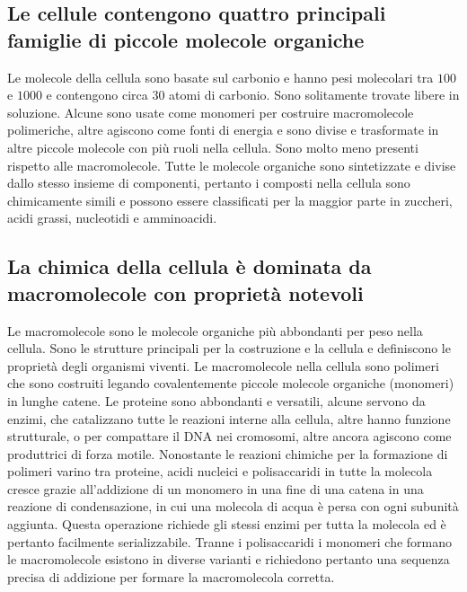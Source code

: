 \subsection{Le cellule contengono quattro principali famiglie di piccole molecole organiche}
Le molecole della cellula sono basate sul carbonio e hanno pesi molecolari tra $100$ e $1000$ e contengono circa $30$ atomi di carbonio. Sono solitamente trovate libere in soluzione.
Alcune sono usate come monomeri per costruire macromolecole polimeriche, altre agiscono come fonti di energia e sono divise e trasformate in altre piccole molecole con pi\`u ruoli nella
cellula. Sono molto meno presenti rispetto alle macromolecole. Tutte le molecole organiche sono sintetizzate e divise dallo stesso insieme di componenti, pertanto i composti nella 
cellula sono chimicamente simili e possono essere classificati per la maggior parte in zuccheri, acidi grassi, nucleotidi e amminoacidi. 
\subsection{La chimica della cellula \`e dominata da macromolecole con propriet\`a notevoli}
Le macromolecole sono le molecole organiche pi\`u abbondanti per peso nella cellula. Sono le strutture principali per la costruzione e la cellula e definiscono le propriet\`a degli 
organismi viventi. Le macromolecole nella cellula sono polimeri che sono costruiti legando covalentemente piccole molecole organiche (monomeri) in lunghe catene. Le proteine sono 
abbondanti e versatili, alcune servono da enzimi, che catalizzano tutte le reazioni interne alla cellula, altre hanno funzione strutturale, o per compattare il DNA nei cromosomi, altre
ancora agiscono come produttrici di forza motile. Nonostante le reazioni chimiche per la formazione di polimeri varino tra proteine, acidi nucleici e polisaccaridi in tutte la 
molecola cresce grazie all'addizione di un monomero in una fine di una catena in una reazione di condensazione, in cui una molecola di acqua \`e persa con ogni subunit\`a aggiunta. 
Questa operazione richiede gli stessi enzimi per tutta la molecola ed \`e pertanto facilmente serializzabile. Tranne i polisaccaridi i monomeri che formano le macromolecole esistono
in diverse varianti e richiedono pertanto una sequenza precisa di addizione per formare la macromolecola corretta. 

